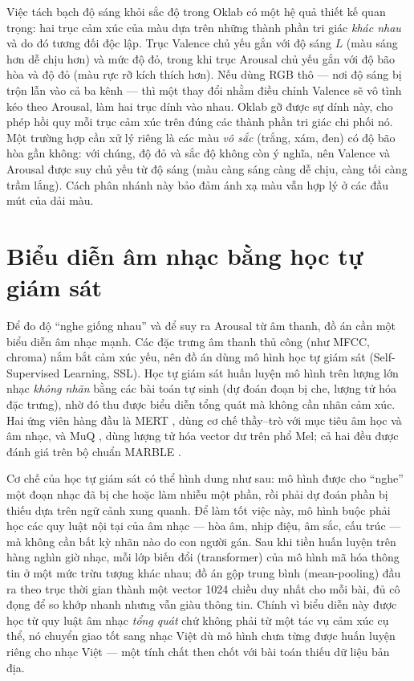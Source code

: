 \documentclass[../DoAn.tex]{subfiles}
\begin{document}
Việc tách bạch độ sáng khỏi sắc độ trong Oklab có một hệ quả thiết kế quan trọng: hai trục cảm xúc của màu dựa trên những thành phần tri giác \textit{khác nhau} và do đó tương đối độc lập. Trục Valence chủ yếu gắn với độ sáng $L$ (màu sáng hơn dễ chịu hơn) và mức độ đỏ, trong khi trục Arousal chủ yếu gắn với độ bão hòa và độ đỏ (màu rực rỡ kích thích hơn). Nếu dùng RGB thô --- nơi độ sáng bị trộn lẫn vào cả ba kênh --- thì một thay đổi nhằm điều chỉnh Valence sẽ vô tình kéo theo Arousal, làm hai trục dính vào nhau. Oklab gỡ được sự dính này, cho phép hồi quy mỗi trục cảm xúc trên đúng các thành phần tri giác chi phối nó. Một trường hợp cần xử lý riêng là các màu \textit{vô sắc} (trắng, xám, đen) có độ bão hòa gần không: với chúng, độ đỏ và sắc độ không còn ý nghĩa, nên Valence và Arousal được suy chủ yếu từ độ sáng (màu càng sáng càng dễ chịu, càng tối càng trầm lắng). Cách phân nhánh này bảo đảm ánh xạ màu vẫn hợp lý ở các đầu mút của dải màu.

\section{Biểu diễn âm nhạc bằng học tự giám sát}
\label{section:3.3}
Để đo độ ``nghe giống nhau'' và để suy ra Arousal từ âm thanh, đồ án cần một biểu diễn âm nhạc mạnh. Các đặc trưng âm thanh thủ công (như MFCC, chroma) nắm bắt cảm xúc yếu, nên đồ án dùng mô hình học tự giám sát (Self-Supervised Learning, SSL). Học tự giám sát huấn luyện mô hình trên lượng lớn nhạc \textit{không nhãn} bằng các bài toán tự sinh (dự đoán đoạn bị che, lượng tử hóa đặc trưng), nhờ đó thu được biểu diễn tổng quát mà không cần nhãn cảm xúc. Hai ứng viên hàng đầu là MERT \cite{li2023mert}, dùng cơ chế thầy--trò với mục tiêu âm học và âm nhạc, và MuQ \cite{zhu2025muq}, dùng lượng tử hóa vector dư trên phổ Mel; cả hai đều được đánh giá trên bộ chuẩn MARBLE \cite{yuan2023marble}.

Cơ chế của học tự giám sát có thể hình dung như sau: mô hình được cho ``nghe'' một đoạn nhạc đã bị che hoặc làm nhiễu một phần, rồi phải dự đoán phần bị thiếu dựa trên ngữ cảnh xung quanh. Để làm tốt việc này, mô hình buộc phải học các quy luật nội tại của âm nhạc --- hòa âm, nhịp điệu, âm sắc, cấu trúc --- mà không cần bất kỳ nhãn nào do con người gán. Sau khi tiền huấn luyện trên hàng nghìn giờ nhạc, mỗi lớp biến đổi (transformer) của mô hình mã hóa thông tin ở một mức trừu tượng khác nhau; đồ án gộp trung bình (mean-pooling) đầu ra theo trục thời gian thành một vector 1024 chiều duy nhất cho mỗi bài, đủ cô đọng để so khớp nhanh nhưng vẫn giàu thông tin. Chính vì biểu diễn này được học từ quy luật âm nhạc \textit{tổng quát} chứ không phải từ một tác vụ cảm xúc cụ thể, nó chuyển giao tốt sang nhạc Việt dù mô hình chưa từng được huấn luyện riêng cho nhạc Việt --- một tính chất then chốt với bài toán thiếu dữ liệu bản địa.
\end{document}
